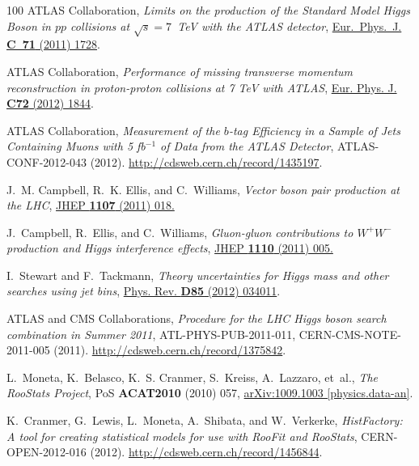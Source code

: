 \documentclass[final,3p,times,twocolumn]{elsarticle}
\begin{document}
\begin{thebibliography}{100}
{ATLAS Collaboration}, {\em {Limits on the production of the Standard Model
  Higgs Boson in $pp$ collisions at $\sqrt{s} = 7$~TeV with the ATLAS
  detector}},
  \href{http://dx.doi.org/10.1140/epjc/s10052-011-1728-9}{Eur.~Phys.~J.
  {\bfseries C~71} (2011) 1728}.

{ATLAS} Collaboration, {\em {Performance of missing transverse momentum
  reconstruction in proton-proton collisions at 7 TeV with ATLAS}},
  \href{http://dx.doi.org/10.1140/epjc/s10052-011-1844-6}{Eur. Phys. J.
  {\bfseries C72} (2012) 1844}.

{ATLAS Collaboration}, {\em {Measurement of the $b$-tag Efficiency in a Sample
  of Jets Containing Muons with 5 fb$^{-1}$ of Data from the ATLAS Detector}},
  ATLAS-CONF-2012-043 (2012). \url{http://cdsweb.cern.ch/record/1435197}.

J.~M. Campbell, R.~K. Ellis, and C.~Williams, {\em {Vector boson pair
  production at the LHC}}, 
  \href{http://dx.doi.org/10.1007/JHEP07(2011)018}{JHEP {\bfseries 1107} (2011) 018.}

J.~Campbell, R.~Ellis, and C.~Williams, {\em {Gluon-gluon contributions to
  $W^{+}W^{-}$ production and Higgs interference effects}}, 
  \href{http://dx.doi.org/10.1007/JHEP10(2011)005}{JHEP {\bfseries 1110}
  (2011) 005.}

I.~Stewart and F.~Tackmann, {\em {Theory uncertainties for Higgs mass and other
  searches using jet bins}},
  \href{http://dx.doi.org/10.1103/PhysRevD.85.034011}{Phys. Rev. {\bfseries
  D85} (2012) 034011}.

{ATLAS and CMS Collaborations}, {\em {Procedure for the LHC Higgs boson search
  combination in Summer 2011}}, ATL-PHYS-PUB-2011-011, CERN-CMS-NOTE-2011-005
  (2011). \url{http://cdsweb.cern.ch/record/1375842}.

L.~Moneta, K.~Belasco, K.~S. Cranmer, S.~Kreiss, A.~Lazzaro, {et~al.}, {\em
  {The RooStats Project}}, PoS {\bfseries ACAT2010} (2010) 057,
  \href{http://arxiv.org/abs/1009.1003}{{\ttfamily arXiv:1009.1003
  [physics.data-an]}}.

K.~Cranmer, G.~Lewis, L.~Moneta, A.~Shibata, and W.~Verkerke, {\em
  {HistFactory: A tool for creating statistical models for use with RooFit and
  RooStats}}, CERN-OPEN-2012-016 (2012).
  \url{http://cdsweb.cern.ch/record/1456844}.


\end{thebibliography}
\end{document}

